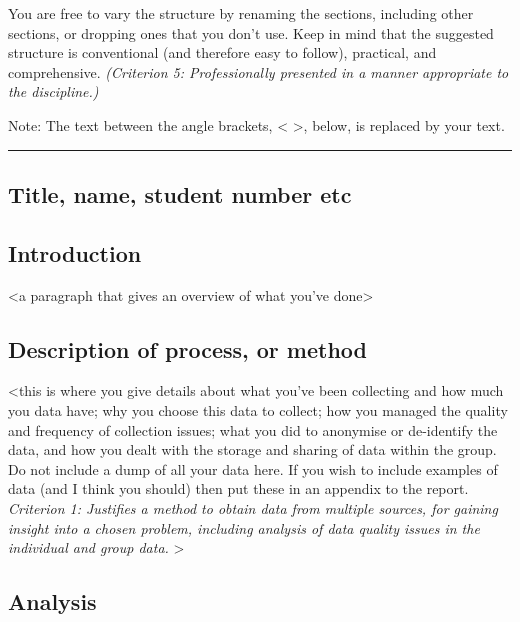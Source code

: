 \documentclass[
]{article}
\begin{document}
You are free to vary the structure by renaming the sections, including
other sections, or dropping ones that you don't use. Keep in mind that
the suggested structure is conventional (and therefore easy to follow),
practical, and comprehensive. \emph{(Criterion 5: Professionally
presented in a manner appropriate to the discipline.)}

Note: The text between the angle brackets, \textless{} \textgreater,
below, is replaced by your text.

\begin{center}\rule{0.5\linewidth}{0.5pt}\end{center}

\hypertarget{title-name-student-number-etc}{%
\subsection{Title, name, student number
etc}\label{title-name-student-number-etc}}

\hypertarget{introduction}{%
\subsection{Introduction}\label{introduction}}

\textless a paragraph that gives an overview of what you've
done\textgreater{}

\hypertarget{description-of-process-or-method}{%
\subsection{Description of process, or
method}\label{description-of-process-or-method}}

\textless this is where you give details about what you've been
collecting and how much you data have; why you choose this data to
collect; how you managed the quality and frequency of collection issues;
what you did to anonymise or de-identify the data, and how you dealt
with the storage and sharing of data within the group. Do not include a
dump of all your data here. If you wish to include examples of data (and
I think you should) then put these in an appendix to the report.\\
\emph{Criterion 1: Justifies a method to obtain data from multiple
sources, for gaining insight into a chosen problem, including analysis
of data quality issues in the individual and group data.} \textgreater{}

\hypertarget{analysis}{%
\subsection{Analysis}\label{analysis}}
\end{document}
